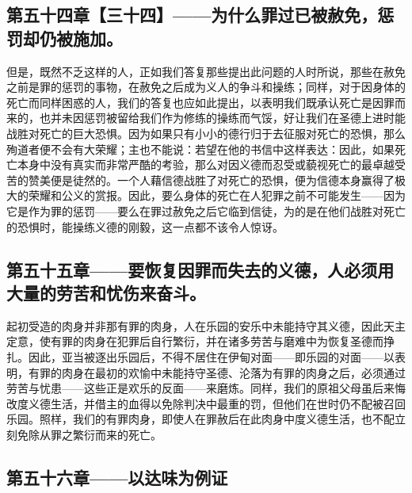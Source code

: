 
\subsection{第五十四章【三十四】——为什么罪过已被赦免，惩罚却仍被施加。}

但是，既然不乏这样的人，正如我们答复那些提出此问题的人时所说，那些在赦免之前是罪的惩罚的事物，在赦免之后成为义人的争斗和操练；同样，对于因身体的死亡而同样困惑的人，我们的答复也应如此提出，以表明我们既承认死亡是因罪而来的，也并未因惩罚被留给我们作为修练的操练而气馁，好让我们在圣德上进时能战胜对死亡的巨大恐惧。因为如果只有小小的德行归于去征服对死亡的恐惧，那么殉道者便不会有大荣耀；主也不能说：若望在他的书信中这样表达：因此，如果死亡本身中没有真实而非常严酷的考验，那么对因义德而忍受或藐视死亡的最卓越受苦的赞美便是徒然的。一个人藉信德战胜了对死亡的恐惧，便为信德本身赢得了极大的荣耀和公义的赏报。因此，要么身体的死亡在人犯罪之前不可能发生——因为它是作为罪的惩罚——要么在罪过赦免之后它临到信徒，为的是在他们战胜对死亡的恐惧时，能操练义德的刚毅，这一点都不该令人惊讶。\par


\subsection{第五十五章——要恢复因罪而失去的义德，人必须用大量的劳苦和忧伤来奋斗。}

起初受造的肉身并非那有罪的肉身，人在乐园的安乐中未能持守其义德，因此天主定意，使有罪的肉身在犯罪后自行繁衍，并在诸多劳苦与磨难中为恢复圣德而挣扎。因此，亚当被逐出乐园后，不得不居住在伊甸对面——即乐园的对面——以表明，有罪的肉身在最初的欢愉中未能持守圣德、沦落为有罪的肉身之后，必须通过劳苦与忧患——这些正是欢乐的反面——来磨炼。同样，我们的原祖父母虽后来悔改度义德生活，并借主的血得以免除判决中最重的罚，但他们在世时仍不配被召回乐园。照样，我们的有罪肉身，即使人在罪赦后在此肉身中度义德生活，也不配立刻免除从罪之繁衍而来的死亡。\par


\subsection{第五十六章——以达味为例证}


